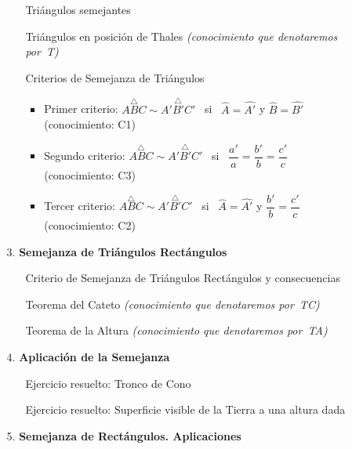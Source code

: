 \begin{itemize}
\begin{itemize}
\begin{itemize}
				\item[\textbullet] Triángulos semejantes
				\item[\textbullet] Triángulos en posición de Thales \textit{(conocimiento que denotaremos \mbox{por \textup{T})}}
				\item[\textbullet] Criterios de Semejanza de Triángulos
				\begin{itemize}
					\item Primer criterio: $\overset{\triangle}{ABC}\sim\overset{\triangle}{A'B'C'}$ \ si \ $\hat{A}=\hat{A'}$ y $\hat{B}=\hat{B'}$ \\(conocimiento: C1)
					\item Segundo criterio: $\overset{\triangle}{ABC}\sim\overset{\triangle}{A'B'C'}$ \ si \ $\dfrac{a'}{a}=\dfrac{b'}{b}=\dfrac{c'}{c}$ \\(conocimiento: C3)
					\item Tercer criterio: $\overset{\triangle}{ABC}\sim\overset{\triangle}{A'B'C'}$ \ si \ $\hat{A}=\hat{A'}$ y $\dfrac{b'}{b}=\dfrac{c'}{c}$ \\(conocimiento: C2)
				\end{itemize}
			\end{itemize}
			\item[3.] \textbf{Semejanza de Triángulos Rectángulos}
			\begin{itemize}
				\item[\textbullet] Criterio de Semejanza de Triángulos Rectángulos y consecuencias
				\item[\textbullet] Teorema del Cateto \textit{(conocimiento que denotaremos \mbox{por \textup{TC})}}
				\item[\textbullet] Teorema de la Altura \textit{(conocimiento que denotaremos \mbox{por \textup{TA})}}
			\end{itemize}
			\item[4.] \textbf{Aplicación de la Semejanza}
			\begin{itemize}
				\item[\textsquare] Ejercicio resuelto: Tronco de Cono
				\item[\textsquare] Ejercicio resuelto: Superficie visible de la Tierra a una altura dada
			\end{itemize}
			\item[5.] \textbf{Semejanza de Rectángulos. Aplicaciones}

\end{itemize}
\end{itemize}
